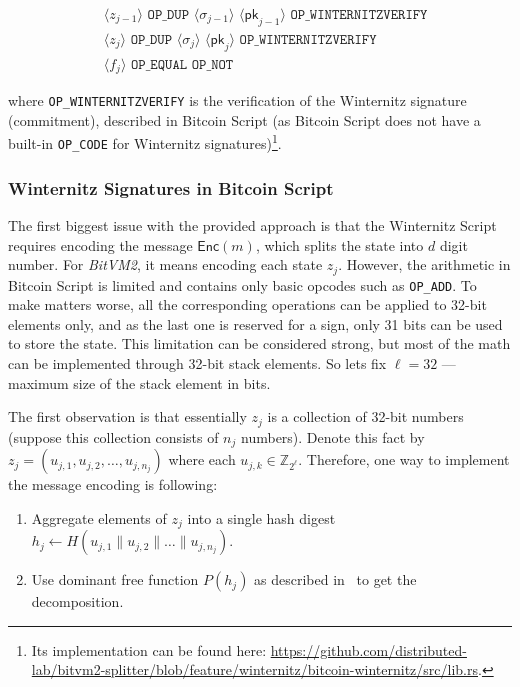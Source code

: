 \documentclass{iacrtrans}
\newcommand{\elem}[1]{\, \langle #1 \rangle \,}
\newcommand{\opcode}[1]{\, \texttt{#1} \,}
\begin{document}
\begin{empheqboxed}
  \begin{align*}
    &\elem{z_{j-1}} \opcode{OP\_DUP} \elem{\sigma_{j-1}}
    \elem{\mathsf{pk}_{j-1}} \opcode{OP\_WINTERNITZVERIFY} \\
    &\elem{z_{j}} \opcode{OP\_DUP} \elem{\sigma_{j}}
    \elem{\mathsf{pk}_{j}} \opcode{OP\_WINTERNITZVERIFY} \\
    &\elem{f_j} \opcode{OP\_EQUAL} \opcode{OP\_NOT}
  \end{align*}
\end{empheqboxed}

where \texttt{OP\_WINTERNITZVERIFY} is the verification of the Winternitz
signature (commitment), described in Bitcoin Script (as Bitcoin Script does not
have a built-in \texttt{OP\_CODE} for Winternitz signatures)\footnote{Its
implementation can be found here:
\url{https://github.com/distributed-lab/bitvm2-splitter/blob/feature/winternitz/bitcoin-winternitz/src/lib.rs}.}.

\subsubsection{Winternitz Signatures in Bitcoin
  Script}\label{sec:winternitz-in-bitcoin-script}

The first biggest issue with the provided approach is that the Winternitz Script
requires encoding the message $\mathsf{Enc}(m)$, which splits the state into $d$
digit number. For \textit{BitVM2}, it means encoding each state $z_j$. However, the
arithmetic in Bitcoin Script is limited and contains only basic opcodes such as
\texttt{OP\_ADD}. To make matters worse, all the corresponding operations can be
applied to 32-bit elements only, and as the last one is reserved for a sign,
only 31 bits can be used to store the state. This limitation can be considered
strong, but most of the math can be implemented through 32-bit stack elements.
So lets fix $\ell = 32$ --- maximum size of the stack element in bits.

The first observation is that essentially $z_j$ is a collection of 32-bit numbers (suppose this collection consists of $n_j$ numbers). Denote this fact by $z_j = (u_{j,1}, u_{j,2}, \dots, u_{j, n_j})$ where each $u_{j,k} \in \mathbb{Z}_{2^{\ell}}$. Therefore, one way to implement the message encoding is following:
\begin{enumerate}
  \item Aggregate elements of $z_j$ into a single hash digest $h_j \gets
  H(u_{j,1} \parallel u_{j,2} \parallel \dots \parallel u_{j,n_j})$.
  \item Use dominant free function $P(h_j)$ as described in~\cite{applied-crypto} to get the decomposition.
\end{enumerate}
\end{document}
